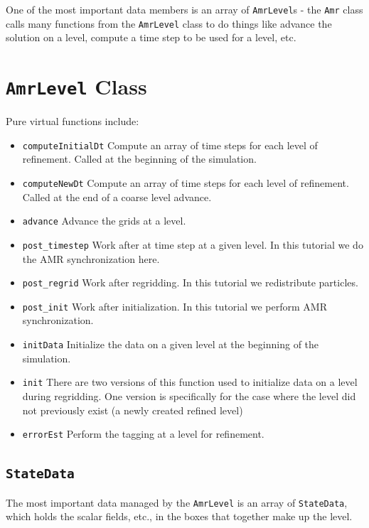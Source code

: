One of the most important data members is an array of {\tt AmrLevel}s -
the {\tt Amr} class calls many functions from the {\tt AmrLevel} class to do
things like advance the solution on a level, compute a time step to be used 
for a level, etc.

\section{{\tt AmrLevel} Class}
Pure virtual functions include:
\begin{itemize}
\item {\tt computeInitialDt} Compute an array of time steps for each level of refinement.
Called at the beginning of the simulation.
\item {\tt computeNewDt} Compute an array of time steps for each level of refinement.
Called at the end of a coarse level advance.
\item {\tt advance} Advance the grids at a level.
\item {\tt post\_timestep} Work after at time step at a given level.  In this tutorial we do the 
AMR synchronization here.
\item {\tt post\_regrid} Work after regridding.  In this tutorial we redistribute particles.
\item {\tt post\_init} Work after initialization.  In this tutorial we perform AMR synchronization.
\item {\tt initData} Initialize the data on a given level at the beginning of the simulation.
\item {\tt init} There are two versions of this function used to initialize data on a level during regridding.  
One version is specifically for the case where the level did not previously exist (a newly created refined level)
\item {\tt errorEst} Perform the tagging at a level for refinement.
\end{itemize}

\subsection{{\tt StateData}}

The most important data managed by the {\tt AmrLevel} is an array of {\tt StateData},
which holds the scalar fields, etc., in the boxes that together make up the level.

